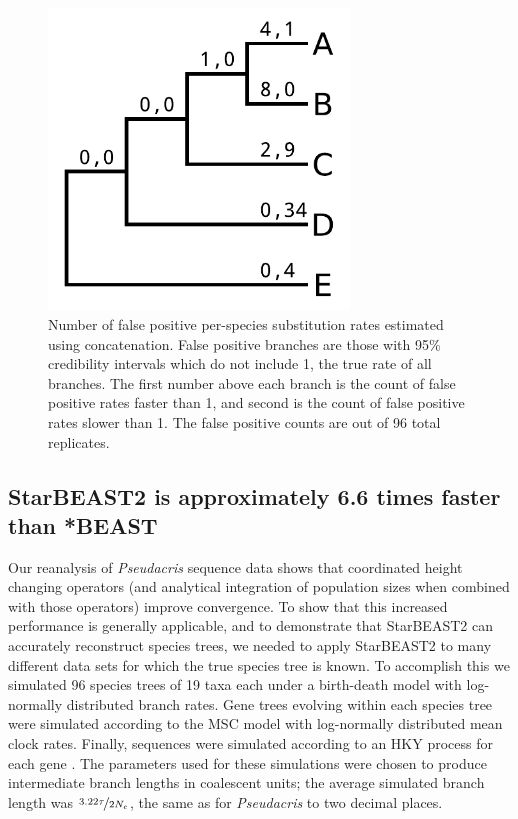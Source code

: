 \documentclass[nogrid]{MBE}%
\begin{document}
\begin{figure}[htb!]
\centering
\includegraphics[width=8cm]{false_positives.pdf}
\caption
{Number of false positive per-species substitution rates estimated using concatenation. False positive
branches are those with 95\% credibility intervals which do not include 1, the
true rate of all branches. The first number above each branch is the count of
false positive rates faster than 1, and second is the count of false positive
rates slower than 1. The false positive counts are out of 96 total replicates.}
\label{fig:spilsFalsePositives}
\end{figure}

\subsection{StarBEAST2 is approximately 6.6 times faster than *BEAST}

Our reanalysis of \textit{Pseudacris} sequence data shows that coordinated height changing operators
(and analytical integration of population sizes when combined with those operators)
improve convergence. To show that this increased performance is generally
applicable, and to demonstrate that StarBEAST2 can accurately reconstruct
species trees, we needed to apply StarBEAST2 to many different data sets for
which the true species tree is known. To accomplish this we simulated 96 species
trees of 19 taxa each under a birth-death model with log-normally distributed
branch rates. Gene trees evolving within each species tree were simulated
according to the MSC model with log-normally distributed mean clock rates.
Finally, sequences were simulated according to an HKY process for each gene
\citep{Hasegawa1985, Goldman1993}. The parameters used for these simulations
were chosen to produce intermediate branch lengths in coalescent units; the
average simulated branch length was $\nicefrac{3.22\tau}{2N_e}$, the same as for
\textit{Pseudacris} to two decimal places.
\end{document}
